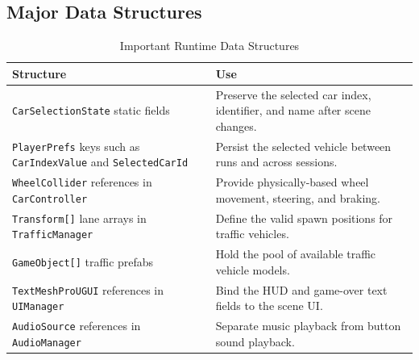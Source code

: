 \documentclass[12pt,a4paper]{article}
\begin{document}
\subsection{Major Data Structures}
\begin{table}[!htbp]
\centering
\caption{Important Runtime Data Structures}
\begin{tabularx}{\textwidth}{@{}L{4.1cm}Y@{}}
\toprule
Structure & Use \\
\midrule
\texttt{CarSelectionState} static fields & Preserve the selected car index, identifier, and name after scene changes. \\
\texttt{PlayerPrefs} keys such as \texttt{CarIndexValue} and \texttt{SelectedCarId} & Persist the selected vehicle between runs and across sessions. \\
\texttt{WheelCollider} references in \texttt{CarController} & Provide physically-based wheel movement, steering, and braking. \\
\texttt{Transform[]} lane arrays in \texttt{TrafficManager} & Define the valid spawn positions for traffic vehicles. \\
\texttt{GameObject[]} traffic prefabs & Hold the pool of available traffic vehicle models. \\
\texttt{TextMeshProUGUI} references in \texttt{UIManager} & Bind the HUD and game-over text fields to the scene UI. \\
\texttt{AudioSource} references in \texttt{AudioManager} & Separate music playback from button sound playback. \\
\bottomrule
\end{tabularx}
\end{table}
\end{document}
